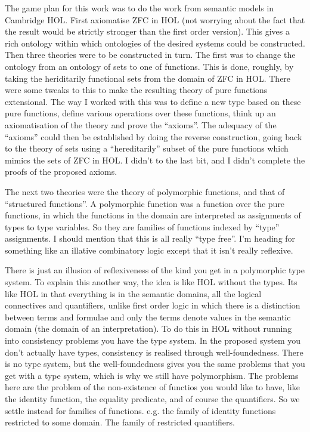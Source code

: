 \documentclass[10pt,titlepage]{book}
\begin{document}
The game plan for this work was to do the work from semantic models in Cambridge HOL.
First axiomatise ZFC in HOL (not worrying about the fact that the result would be strictly stronger than the first order version).
This gives a rich ontology within which ontologies of the desired systems could be constructed.
Then three theories were to be constructed in turn.
The first was to change the ontology from an ontology of sets to one of functions.
This is done, roughly, by taking the heriditarily functional sets from the domain of ZFC in HOL.
There were some tweaks to this to make the resulting theory of pure functions extensional.
The way I worked with this was to define a new type based on these pure functions, define various operations over these functions, think up an axiomatisation of the theory and prove the ``axioms''.
The adequacy of the ``axioms'' could then be established by doing the reverse construction, going back to the theory of sets using a ``hereditarily'' subset of the pure functions which mimics the sets of ZFC in HOL.
I didn't to the last bit, and I didn't complete the proofs of the proposed axioms.

The next two theories were the theory of polymorphic functions, and that of ``structured functions''.
A polymorphic function was a function over the pure functions, in which the functions in the domain are interpreted as assignments of types to type variables.
So they are families of functions indexed by ``type'' assignments.
I should mention that this is all really ``type free''.
I'm heading for something like an illative combinatory logic except that it isn't really reflexive.

There is just an illusion of reflexiveness of the kind you get in a polymorphic type system.
To explain this another way, the idea is like HOL without the types.
Its like HOL in that everything is in the semantic domains, all the logical connectives and quantifiers, unlike first order logic in which there is a distinction between terms and formulae and only the terms denote values in the semantic domain (the domain of an interpretation).
To do this in HOL without running into consistency problems you have the type system.
In the proposed system you don't actually have types, consistency is realised through well-foundedness.
There is no type system, but the well-foundedness gives you the same problems that you get with a type system, which is why we still have polymorphism.
The problems here are the problem of the non-existence of functios you would like to have, like the identity function, the equality predicate, and of course the quantifiers.
So we settle instead for families of functions.
e.g. the family of identity functions restricted to some domain.
The family of restricted quantifiers.
\end{document}
